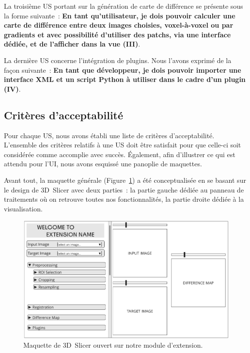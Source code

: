 \documentclass{article}
\begin{document}
{{        \bigskip

        La troisième US portant sur la génération de carte de différence se présente sous la forme suivante~: \textbf{En tant qu'utilisateur, je dois pouvoir calculer une carte de différence entre deux images choisies, voxel-à-voxel ou par gradients et avec possibilité d'utiliser des patchs, via une interface dédiée, et de l'afficher dans la vue (III)}.
        \label{us:diff-map}

        \bigskip

        La dernière US concerne l'intégration de plugins. Nous l'avons exprimé de la façon suivante~: \textbf{En tant que développeur, je dois pouvoir importer une interface XML et un script Python à utiliser dans le cadre d'un plugin (IV)}.
        \label{us:plugins}
    }

    {
        \bigskip
        \subsection{Critères d'acceptabilité}
        \label{subsec:acceptance-criteria}

        Pour chaque US, nous avons établi une liste de critères d'acceptabilité. L'ensemble des critères relatifs à une US doit être satisfait pour que celle-ci soit considérée comme accomplie avec succès. Également, afin d'illustrer ce qui est attendu pour l'UI, nous avons esquissé une panoplie de maquettes.

        \bigskip

        Avant tout, la maquette générale (Figure~\ref{fig:ui-mock-up}) a été conceptualisée en se basant sur le design de 3D~Slicer avec deux parties~: la partie gauche dédiée au panneau de traitements où on retrouve toutes nos fonctionnalités, la partie droite dédiée à la visualisation.

        \begin{figure}[!ht]
            \centering
            \includegraphics[width=\textwidth]{images/ui-mock-up.png}
            \caption{Maquette de 3D~Slicer ouvert sur notre module d'extension.}
            \label{fig:ui-mock-up}
        \end{figure}

}}
\end{document}
